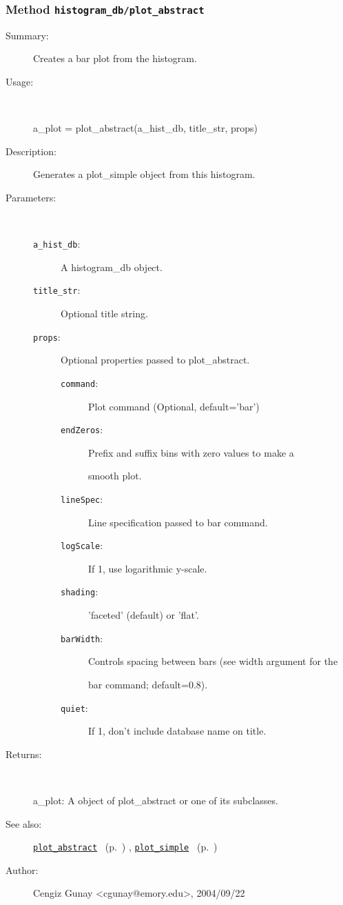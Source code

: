 \subsubsection[Method \texttt{plot\_abstract}]{Method \texttt{histogram\_db/plot\_abstract}}%
%
\label{ref_histogram_db__plot_abstract}%
\hypertarget{ref_histogram_db__plot_abstract}{}%
\begin{description}
\item[Summary:]Creates a bar plot from the histogram.
%
\item[Usage:]~%
\begin{lyxcode}%
a\_plot = plot\_abstract(a\_hist\_db, title\_str, props)
%
\end{lyxcode}%
%
\item[Description:]%
Generates a plot\_simple object from this histogram.
\item[Parameters:]~
\begin{description}%
\item[\texttt{a\_hist\_db}:]
 A histogram\_db object.
\item[\texttt{title\_str}:]
 Optional title string.
\item[\texttt{props}:]
 Optional properties passed to plot\_abstract.
\begin{description}%
\item[\texttt{command}:]
 Plot command (Optional, default='bar')
\item[\texttt{endZeros}:]
 Prefix and suffix bins with zero values to make a

smooth plot.
\item[\texttt{lineSpec}:]
 Line specification passed to bar command.
\item[\texttt{logScale}:]
 If 1, use logarithmic y-scale.
\item[\texttt{shading}:]
 'faceted' (default) or 'flat'.
\item[\texttt{barWidth}:]
 Controls spacing between bars (see width argument for the

bar command; default=0.8).
\item[\texttt{quiet}:]
 If 1, don't include database name on title.
\end{description}%
\end{description}%
%
\item[Returns:
]~

	a\_plot: A object of plot\_abstract or one of its subclasses.
%
%
\item[See also:]%
\hyperlink{ref_plot_abstract}{\texttt{plot\_abstract}}%
\ (p.~\pageref{ref_plot_abstract})%
%
, \hyperlink{ref_plot_simple}{\texttt{plot\_simple}}%
\ (p.~\pageref{ref_plot_simple})%
%
%
\item[Author:]%
Cengiz Gunay <cgunay@emory.edu>, 2004/09/22
%
\end{description}
\methodline%
